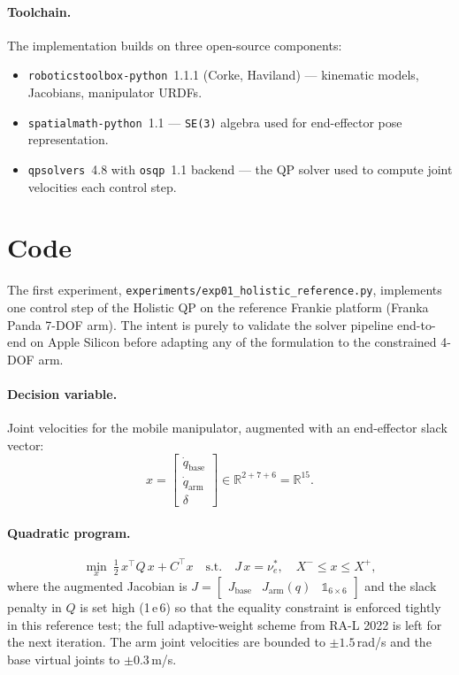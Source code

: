 \documentclass[11pt]{article}
\begin{document}
\paragraph{Toolchain.} The implementation builds on three open-source
components:
\begin{itemize}[noitemsep]
  \item \texttt{roboticstoolbox-python}~1.1.1 (Corke, Haviland) ---
        kinematic models, Jacobians, manipulator URDFs.
  \item \texttt{spatialmath-python}~1.1 --- \texttt{SE(3)} algebra used
        for end-effector pose representation.
  \item \texttt{qpsolvers}~4.8 with \texttt{osqp}~1.1 backend --- the QP
        solver used to compute joint velocities each control step.
\end{itemize}

\section{Code}

The first experiment, \texttt{experiments/exp01\_holistic\_reference.py},
implements one control step of the Holistic QP on the reference Frankie
platform (Franka Panda 7-DOF arm). The intent is purely to validate the
solver pipeline end-to-end on Apple Silicon before adapting any of the
formulation to the constrained 4-DOF arm.

\paragraph{Decision variable.} Joint velocities for the mobile
manipulator, augmented with an end-effector slack vector:
\[
  x = \begin{bmatrix} \dot{q}_{\text{base}} \\
                       \dot{q}_{\text{arm}} \\
                       \delta \end{bmatrix}
     \in \mathbb{R}^{2 + 7 + 6} = \mathbb{R}^{15}.
\]

\paragraph{Quadratic program.}
\[
  \min_{x}\ \tfrac{1}{2}\, x^\top Q\, x + C^\top x
  \quad\text{s.t.}\quad
  J\, x = \nu^*_e,\quad
  X^{-} \le x \le X^{+},
\]
where the augmented Jacobian is
\(
  J = \begin{bmatrix} J_{\text{base}} & J_{\text{arm}}(q) & \mathbb{1}_{6 \times 6}\end{bmatrix}
\)
and the slack penalty in $Q$ is set high (1\,e\,6) so that the equality
constraint is enforced tightly in this reference test; the full
adaptive-weight scheme from RA-L 2022 is left for the next iteration.
The arm joint velocities are bounded to $\pm 1.5\,$rad/s and the base
virtual joints to $\pm 0.3\,$m/s.
\end{document}

